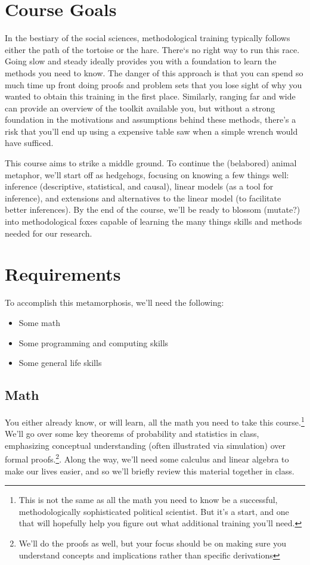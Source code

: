 
\section{Course Goals}
In the bestiary of the social sciences, methodological training typically follows either the path of the tortoise or the hare. There`s no right way to run this race. Going slow and steady ideally provides you with a foundation to learn the methods you need to know. The danger of this approach is that you can spend so much time up front doing proofs and problem sets that you lose sight of why you wanted to obtain this training in the first place. Similarly, ranging far and wide can provide an overview of the toolkit available you, but without a strong foundation in the motivations and assumptions behind these methods, there's a risk that you'll end up using a expensive table saw when a simple wrench would have sufficed.

This course aims to strike a middle ground. To continue the (belabored) animal metaphor, we'll start off as hedgehogs, focusing on knowing a few things well: inference (descriptive, statistical, and causal), linear models (as a tool for inference), and extensions and alternatives to the linear model (to facilitate better inferences). By the end of the course, we'll be ready to blossom (mutate?) into methodological foxes capable of learning the many things skills and methods needed for our research.

\section{Requirements}
To accomplish this metamorphosis, we'll need the following:

\begin{itemize}
\item Some math
\item Some programming and computing skills
\item Some general life skills
\end{itemize}

\subsection{Math}

You either already know, or will learn, all the math you need to take this course.\footnote{This is not the same as all the math you need to know be a successful, methodologically sophisticated political scientist. But it's a start, and one that will hopefully help you figure out what additional training you'll need.} We'll go over some key theorems of probability and statistics in class, emphasizing conceptual understanding (often illustrated via simulation) over formal proofs.\footnote{We'll do the proofs as well, but your focus should be on making sure you understand concepts and implications rather than specific derivations}. Along the way, we'll need some calculus and linear algebra to make our lives easier, and so we'll briefly review this material together in class.

